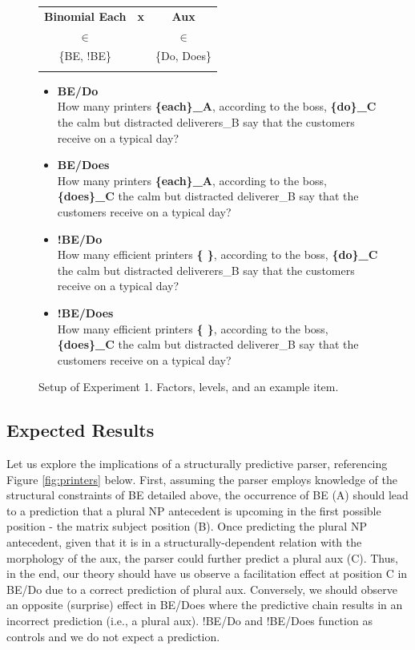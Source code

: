 \documentclass[12pt]{article}
\begin{document}
\begin{figure}[h!]
    \centering
    \begin{tabular}{cll}
    \textbf{Binomial Each}                & \multicolumn{1}{c}{\textbf{x}} & \multicolumn{1}{c}{\textbf{Aux}}   \\
    $\in$                         &                       & \multicolumn{1}{c}{$\in$} \\
    \{BE, !BE\}                 &                       & \{Do, Does\}              \\
    \multicolumn{1}{l}{\textbf{}} &                       &                          
    \end{tabular}
    \begin{itemize}[label={}]
        \item \textbf{BE/Do} \\ How many printers \textbf{\{each\}_A}, according to the boss, \textbf{\{do\}_C} the calm but distracted deliverers_B say that the customers receive on a typical day?
        \item \textbf{BE/Does} \\ How many printers \textbf{\{each\}_A}, according to the boss, \textbf{\{does\}_C} the calm but distracted deliverer_B say that the customers receive on a typical day?
        \item \textbf{!BE/Do} \\ How many efficient printers \textbf{\{ \}}, according to the boss, \textbf{\{do\}_C} the calm but distracted deliverers_B say that the customers receive on a typical day?
        \item \textbf{!BE/Does} \\ How many efficient printers \textbf{\{ \}}, according to the boss, \textbf{\{does\}_C} the calm but distracted deliverer_B say that the customers receive on a typical day?
    \end{itemize} 
    \caption{Setup of Experiment 1. Factors, levels, and an example item.}
    \label{setupexp1}
\end{figure}

\subsection{Expected Results}
Let us explore the implications of a structurally predictive parser, referencing Figure \ref{fig:printers} below.
First, assuming the parser employs knowledge of the structural constraints of BE detailed above, the occurrence of BE (A) should lead to a prediction that a plural NP antecedent is upcoming in the first possible position - the matrix subject position (B). Once predicting the plural NP antecedent, given that it is in a structurally-dependent relation
with the morphology of the aux, the parser could further predict a plural aux (C). Thus, in the end, our theory should have us observe a facilitation effect at position C in BE/Do due to a correct prediction of plural aux. Conversely, we should observe an opposite (surprise) effect in BE/Does where the predictive chain results in an incorrect prediction (i.e., a plural aux). !BE/Do and !BE/Does function as controls and we do not expect a prediction.
\end{document}
